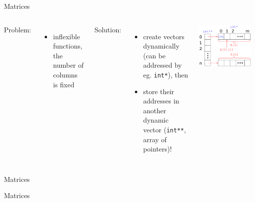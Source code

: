 \documentclass[usenames,dvipsnames,aspectratio=169]{beamer}
\begin{document}
\begin{frame}{Matrices}
  \begin{columns}[T]
      Problem:
      \begin{itemize}
        \item[] inflexible functions, the number of columns is fixed
      \end{itemize}
      \vfill
      Solution:
      \begin{itemize}
        \item create vectors dynamically (can be addressed by eg. \texttt{int*}), then 
        \item store their addresses in another dynamic vector (\texttt{int**}, array of pointers)!
      \end{itemize}
      \includegraphics[width=\textwidth]{matrix2.pdf}
  \end{columns}
\end{frame}

\begin{frame}{Matrices}
  \footnotesize
  \begin{exampleblock}{}
    \vspace{-.3cm}
    
    \vspace{-.3cm}
  \end{exampleblock}
\end{frame}

\begin{frame}{Matrices}
  \begin{exampleblock}{}
    \footnotesize
    
  \end{exampleblock}
\end{frame}
\end{document}
